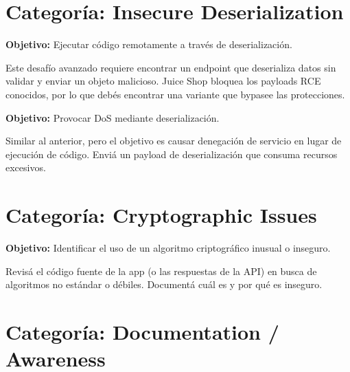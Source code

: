 \documentclass[11pt,a4paper]{article}
\begin{document}
\section{Categoría: Insecure Deserialization}

\begin{desafio}
\textbf{Objetivo:} Ejecutar código remotamente a través de deserialización.
\begin{solucion}
Este desafío avanzado requiere encontrar un endpoint que deserializa datos sin validar y enviar un objeto malicioso. Juice Shop bloquea los payloads RCE conocidos, por lo que debés encontrar una variante que bypasee las protecciones.
\end{solucion}
\end{desafio}

\begin{desafio}
\textbf{Objetivo:} Provocar DoS mediante deserialización.
\begin{solucion}
Similar al anterior, pero el objetivo es causar denegación de servicio en lugar de ejecución de código. Enviá un payload de deserialización que consuma recursos excesivos.
\end{solucion}
\end{desafio}

\section{Categoría: Cryptographic Issues}

\begin{desafio}
\textbf{Objetivo:} Identificar el uso de un algoritmo criptográfico inusual o inseguro.
\begin{solucion}
Revisá el código fuente de la app (o las respuestas de la API) en busca de algoritmos no estándar o débiles. Documentá cuál es y por qué es inseguro.
\end{solucion}
\end{desafio}

\section{Categoría: Documentation / Awareness}
\end{document}
